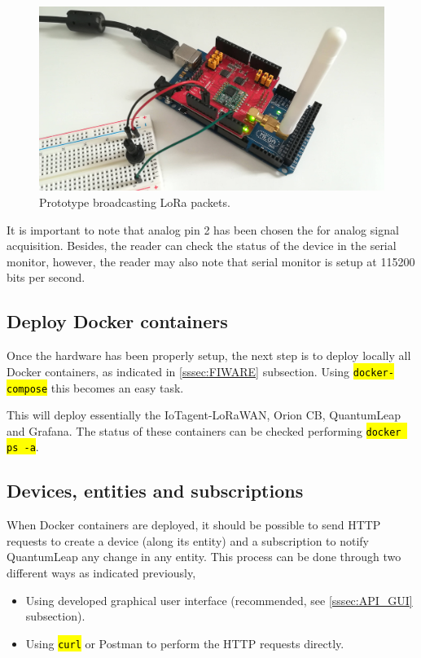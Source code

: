 \documentclass[11pt,a4paper,dvipsnames,twoside]{article}
\newcommand{\cmd}[1] {\hl{\texttt{#1}}}
\begin{document}
\begin{figure}[ht]
  \centering
  \includegraphics[width=.9\textwidth]{../pictures/prototype.jpg}
  \caption{Prototype broadcasting LoRa packets.}
  \label{fig:prototype}
\end{figure}

It is important to note that analog pin 2 has been chosen the for analog signal acquisition. Besides, the reader can check the status of the device in the serial monitor, however, the reader may also note that serial monitor is setup at 115200 bits per second.

\subsection{Deploy Docker containers}
Once the hardware has been properly setup, the next step is to deploy locally all Docker containers, as indicated in \ref{sssec:FIWARE} subsection. Using \cmd{docker-compose} this becomes an easy task. 

This will deploy essentially the IoTagent-LoRaWAN, Orion CB, QuantumLeap and Grafana. The status of these containers can be checked performing \cmd{docker ps -a}.

\subsection{Devices, entities and subscriptions}
When Docker containers are deployed, it should be possible to send HTTP requests to create a device (along its entity) and a subscription to notify QuantumLeap any change in any entity. This process can be done through two different ways as indicated previously, 

\begin{itemize}
  \item Using developed graphical user interface (recommended, see \ref{sssec:API_GUI} subsection).
  \item Using \cmd{curl} or Postman to perform the HTTP requests directly.
\end{itemize}
\end{document}
